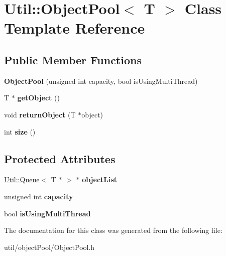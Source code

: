 \hypertarget{class_util_1_1_object_pool}{}\section{Util\+:\+:Object\+Pool$<$ T $>$ Class Template Reference}
\label{class_util_1_1_object_pool}
\subsection*{Public Member Functions}
\begin{DoxyCompactItemize}
\item 
\mbox{\label{class_util_1_1_object_pool_a05824b550fbbd97beee8ff7bdc7a1b6a}} 
{\bfseries Object\+Pool} (unsigned int capacity, bool is\+Using\+Multi\+Thread)
\item 
\mbox{\label{class_util_1_1_object_pool_afe1d978de39c51f05aaa53aa3d466d27}} 
T $\ast$ {\bfseries get\+Object} ()
\item 
\mbox{\label{class_util_1_1_object_pool_af830036cb3f77b3264fa4468c713dbc5}} 
void {\bfseries return\+Object} (T $\ast$object)
\item 
\mbox{\label{class_util_1_1_object_pool_a9be23d99fe9119b4a11d96aa78048121}} 
int {\bfseries size} ()
\end{DoxyCompactItemize}
\subsection*{Protected Attributes}
\begin{DoxyCompactItemize}
\item 
\mbox{\label{class_util_1_1_object_pool_a9afa8e2e55e58041840e42d3b1c4b96f}} 
\mbox{\hyperlink{class_util_1_1_queue}{Util\+::\+Queue}}$<$ T $\ast$ $>$ $\ast$ {\bfseries object\+List}
\item 
\mbox{\label{class_util_1_1_object_pool_ac9c0d7430fa4c74ef62db2cb64d38b10}} 
unsigned int {\bfseries capacity}
\item 
\mbox{\label{class_util_1_1_object_pool_aa5a993f164ed3f5ba4e7cda233fc64b8}} 
bool {\bfseries is\+Using\+Multi\+Thread}
\end{DoxyCompactItemize}


The documentation for this class was generated from the following file\+:\begin{DoxyCompactItemize}
\item 
util/object\+Pool/Object\+Pool.\+h\end{DoxyCompactItemize}

